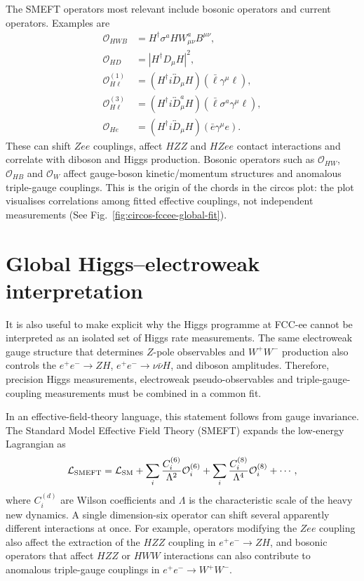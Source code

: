 \documentclass[11pt,a4paper]{report}
\begin{document}
The SMEFT operators most relevant include bosonic operators and current operators.  Examples are
\begin{align}
  \mathcal O_{HWB}&=H^\dagger\sigma^aH W^a_{\mu\nu}B^{\mu\nu},\\
  \mathcal O_{HD}&=\left|H^\dagger D_\mu H\right|^2,\\
  \mathcal O_{H\ell}^{(1)}&=(H^\dagger i\overleftrightarrow D_\mu H)(\bar\ell\gamma^\mu\ell),\\
  \mathcal O_{H\ell}^{(3)}&=(H^\dagger i\overleftrightarrow D_\mu^a H)(\bar\ell\sigma^a\gamma^\mu\ell),\\
  \mathcal O_{He}&=(H^\dagger i\overleftrightarrow D_\mu H)(\bar e\gamma^\mu e).
\end{align}
These can shift $Zee$ couplings, affect $HZZ$ and $HZee$ contact interactions and correlate with diboson and Higgs production.  Bosonic operators such as $\mathcal O_{HW}$, $\mathcal O_{HB}$ and $\mathcal O_W$ affect gauge-boson kinetic/momentum structures and anomalous triple-gauge couplings.  This is the origin of the chords in the circos plot: the plot visualises correlations among fitted effective couplings, not independent measurements (See Fig.~\ref{fig:circos-fccee-global-fit}).



\section{Global Higgs--electroweak interpretation}
\label{sec:global-higgs-ew-before-top}

It is also useful to make explicit why the
Higgs programme at FCC-ee cannot be interpreted as an isolated set of Higgs
rate measurements.  The same electroweak gauge structure that determines
\(Z\)-pole observables and \(W^+W^-\) production also controls the
\(e^+e^-\to ZH\), \(e^+e^-\to \nu\bar\nu H\), and diboson amplitudes.
Therefore, precision Higgs measurements, electroweak pseudo-observables and
triple-gauge-coupling measurements must be combined in a common fit.

In an effective-field-theory language, this statement follows from gauge
invariance.  The Standard Model Effective Field Theory (SMEFT) expands the
low-energy Lagrangian as
\begin{equation}
	\mathcal L_{\rm SMEFT}
	=
	\mathcal L_{\rm SM}
	+
	\sum_i
	\frac{C_i^{(6)}}{\Lambda^2}
	\mathcal O_i^{(6)}
	+
	\sum_i
	\frac{C_i^{(8)}}{\Lambda^4}
	\mathcal O_i^{(8)}
	+\cdots ,
	\label{eq:smeft-expansion-global-ew-higgs}
\end{equation}
where \(C_i^{(d)}\) are Wilson coefficients and \(\Lambda\) is the
characteristic scale of the heavy new dynamics.  A single dimension-six
operator can shift several apparently different interactions at once.  For
example, operators modifying the \(Zee\) coupling also affect the extraction
of the \(HZZ\) coupling in \(e^+e^-\to ZH\), and bosonic operators that affect
\(HZZ\) or \(HWW\) interactions can also contribute to anomalous triple-gauge
couplings in \(e^+e^-\to W^+W^-\).
\end{document}
